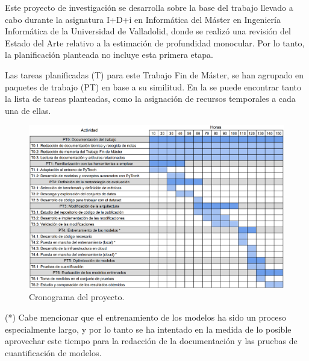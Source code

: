 
Este proyecto de investigación se desarrolla sobre la base del trabajo llevado a cabo durante la asignatura I+D+i en Informática del Máster en Ingeniería Informática de la Universidad de Valladolid, donde se realizó una revisión del Estado del Arte relativo a la estimación de profundidad monocular. Por lo tanto, la planificación planteada no incluye esta primera etapa.

Las tareas planificadas (T) para este Trabajo Fin de Máster, se han agrupado en paquetes de trabajo (PT) en base a su similitud. En la  se puede encontrar tanto la lista de tareas planteadas, como la asignación de recursos temporales a cada una de ellas.

\begin{figure}[H]
\centering
\includegraphics[width=\textwidth]{imagenes/planificacion.png}
\caption{Cronograma del proyecto.}
\label{fig:cronograma}
\end{figure}

(*) Cabe mencionar que el entrenamiento de los modelos ha sido un proceso especialmente largo, y por lo tanto se ha intentado en la medida de lo posible aprovechar este tiempo para la redacción de la documentación y las pruebas de cuantificación de modelos. 